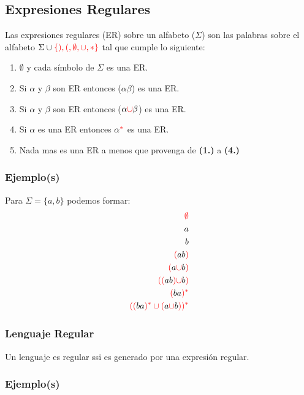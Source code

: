 \subsection{Expresiones Regulares}
Las expresiones regulares (ER) sobre un alfabeto ($\Sigma$) son las palabras sobre el alfabeto $\Sigma \cup {\color{red}\{ ), (, \emptyset, \cup,*\}}$ tal que cumple lo siguiente:
\renewcommand{\labelenumi}{\theenumi}
\renewcommand{\theenumi}{\textbf{\arabic {enumi}.)}}%
\begin{enumerate}
\item {\color{red}$\emptyset$} y cada símbolo de $\Sigma$ es una ER.
\item Si $\alpha$ y $\beta$ son ER entonces {\color{red}(}$\alpha\beta${\color{red})} es una ER.
\item Si $\alpha$ y $\beta$ son ER entonces {\color{red}(}$\alpha{\color{red}\cup}\beta${\color{red})} es una ER.
\item Si $\alpha$ es una ER entonces $\alpha^{{\color{red}*}}$ es una ER.
\item Nada mas es una ER a menos que provenga de \textbf{(1.)} a \textbf{(4.)}
\end{enumerate}
\subsubsection*{Ejemplo(s)}
Para $\Sigma = \{ a,b \}$ podemos formar:
\begin{align*}
{{\color{red}\emptyset}}\\
a\\
b\\
{{\color{red}(}}ab{{\color{red})}}\\
{{\color{red}(}}a{\color{red}\cup}b{{\color{red})}}\\
{{\color{red}(}}{\color{red}(}ab{\color{red})}{\color{red}\cup}b{{\color{red})}}\\
{{\color{red}(}}ba{{\color{red})^*}}\\
{\color{red}((}ba{\color{red})^*\cup(}a{\color{red}\cup}b{\color{red}))^*}
\end{align*}
\subsubsection*{Lenguaje Regular}
Un lenguaje es regular ssi es generado por una expresión regular.
\subsubsection*{Ejemplo(s)}

